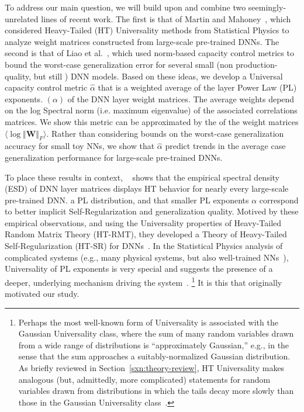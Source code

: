 To address our main question, we will build upon and combine two seemingly-unrelated lines of recent work.
The first is that of Martin and Mahoney~\cite{MM17_TR,MM18_TR}, which considered Heavy-Tailed (HT) Universality methods from Statistical Physics to analyze weight matrices constructed from large-scale pre-trained DNNs.
The second is that of Liao et al.~\cite{LMBx18_TR}, which used norm-based capacity control metrics to bound the worst-case generalization error for several small (non production-quality, but still ) DNN models.
Based on these ideas, we develop a Universal capacity control metric $\hat{\alpha}$ that is a weighted average of the layer Power Law (PL) exponents.
$(\alpha)$ of the DNN layer weight matrices. The average weights depend on the log Spectral norm (i.e. maximum eigenvalue) of the associated correlations matrices.
We show this metric can be approximated by the    of the weight matrices $\langle\log\Vert\mathbf{W}\Vert_F{}\rangle$.
Rather than considering bounds on the worst-case generalization accuracy for small toy NNs, we show that $\hat{\alpha}$ predict trends 
in the average case generalization performance for large-scale pre-trained DNNs.

To place these results in context, ~\cite{MM18_TR}
 shows that the empirical spectral density (ESD) of DNN layer matrices 
  displays HT behavior for nearly every large-scale pre-trained DNN.
   a PL distribution, and that smaller PL exponents $\alpha$ correspond to better implicit Self-Regularization and generalization quality.
Motived by these empirical observations, and using the Universality properties of Heavy-Tailed Random Matrix Theory (HT-RMT), they developed a Theory of Heavy-Tailed Self-Regularization (HT-SR) for DNNs~\cite{MM17_TR,MM18_TR}.
In the Statistical Physics analysis of complicated systems (e.g., many physical systems, but also well-trained NNs~\cite{EB01_BOOK,nishimori01}), Universality of PL exponents is very special and suggests the presence of a deeper, underlying mechanism driving the system~\cite{SornetteBook,BouchaudPotters03}.%
\footnote{Perhaps the most well-known form of Universality is associated with the Gaussian Universality class, where the sum of many random variables drawn from a wide range of distributions is ``approximately Gaussian,'' e.g., in the sense that the sum approaches a suitably-normalized Gaussian distribution.  As briefly reviewed in Section~\ref{sxn:theory-review}, HT Universality makes analogous (but, admittedly, more complicated) statements for random variables drawn from distributions in which the tails decay more slowly than those in the Gaussian Universality class~\cite{MM18_TR}.}
It is this  that originally motivated our study.


